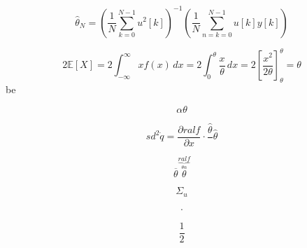 \begin{equation}
  \hat{\theta}_N=\left( \frac{1}{N} \sum_{k=0}^{N-1} u^{2}[k] \right) ^{-1} (\frac{1}{N} \sum_{n=k=0}^{N-1} u[k]y[k])
\end{equation} 

\begin{equation}
  2 \mathbb{E}[X]=2 \int_{-\infty}^{\infty} xf(x) \, dx=2 \int_{0}^{\theta} \frac{x}{\theta} \, dx = 2 \left[ \frac{x^2}{2\theta} \right]^{\theta}_\theta=\theta
\end{equation} 
 be

 \begin{equation}
 \alpha \theta 
 \end{equation} 

\begin{equation}
sd^{2}
\dot{q}= \frac{\partial ralf}{\partial x} \cdot \frac{\hat{\theta}}{} \hat{\theta}
\end{equation} 

\begin{equation}
\overline{\theta}
\overset{\underbrace{ralf}_{\theta\overset{}{\alpha}}}{\theta}
\end{equation} 

\begin{equation}
\Sigma_u
\end{equation} 

\begin{align*}
  
.\end{align*}

\begin{equation}
  \frac{1}{2}
\end{equation}

\begin{equation}
  \frac{}{}
\end{equation}
